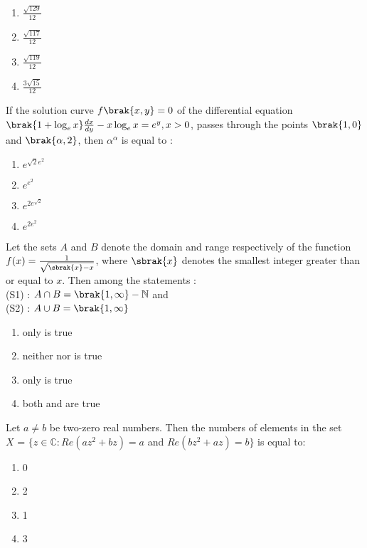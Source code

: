 \begin{enumerate}
        \item $\frac{\sqrt{129}}{12}$ 
        \item $\frac{\sqrt{117}}{12}$
 \item $\frac{\sqrt{119}}{12}$ 
        \item $\frac{3\sqrt{15}}{12}$
\end{enumerate}
\item If the solution curve $f\brak{x, y} = 0$ of the differential equation $\brak{1+ \log_e x}\frac{dx}{dy} - x \log_e x =e^y, x>0$, passes through the points $\brak{1, 0}$ and $\brak{\alpha,2}$, then $\alpha ^{\alpha}$ is equal to : \hfill{}
        \begin{enumerate}
                \item $e^{\sqrt{2}e^2}$
                \item $e^{e^2}$
                \item $e^{2e^{\sqrt{2}}}$ 
        \item $e^{2e^2}$    
\end{enumerate}
\item Let the sets $A$ and $B$ denote the domain and range respectively of the function $f(x)=\frac{1}{\sqrt{\sbrak{x}-x}}$, where $\sbrak{x}$ denotes the smallest integer greater than or equal to $x$. Then among the statements :\hfill{} \\
	(S1) : $A \cap B = \brak{1,\infty} - \mathbb{N}$ and \\
(S2) : $A \cup B = \brak{1,\infty}$
 \begin{enumerate}
	 \item only  is true
	 \item neither  nor  is true
	 \item only  is true
	 \item both  and  are true
\end{enumerate}
\item Let $a \neq b$ be two-zero real numbers. Then the numbers of elements in the set \\ $X$ = $\{$$z \in \mathbb{C}:Re(az^2+bz)=a$  and $Re(bz^2+az)=b$$\}$ is equal to: \hfill{}
\begin{enumerate}
                \item 0
                \item 2
                \item 1
                \item 3
\end{enumerate}

